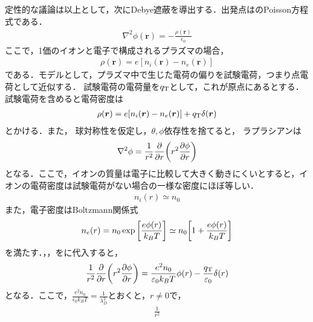 \documentclass{report}
\begin{document}
定性的な議論は以上として，次にDebye遮蔽を導出する．出発点はのPoisson方程式である．
\begin{align}
  \nabla^2 \phi(\bm{r}) = -\frac{\rho(\bm{r})}{\epsilon_0} \label{poisson-eq}
\end{align}
ここで，1価のイオンと電子で構成されるプラズマの場合，
\begin{align}
  \rho(\bm{r}) = e[n_i(\bm{r}) - n_e(\bm{r})]
\end{align}
である．モデルとして，プラズマ中で生じた電荷の偏りを試験電荷，つまり点電荷として近似する．
試験電荷の電荷量を$q_{\mathrm{T}}$として，これが原点にあるとする．
試験電荷を含めると電荷密度は
\begin{align}
  \rho(\bm{r}) = e[n_i(\bm{r}) - n_e(\bm{r})] + q_{\mathrm{T}}\delta(\bm{r}) \label{density-charge}
\end{align}
とかける．また，
球対称性を仮定し，$\theta,\phi$依存性を捨てると，
ラプラシアンは
\begin{align}
  \nabla^2\phi = \frac{1}{r^2} \frac{\partial}{\partial r} \qty(r^2 \frac{\partial \phi}{\partial r})
\end{align}
となる．ここで，イオンの質量は電子に比較して大きく動きにくいとすると，イオンの電荷密度は試験電荷がない場合の一様な密度にほぼ等しい．
\begin{align}
  n_i(r) \simeq n_0 \label{density-ion}
\end{align}
また，電子密度はBoltzmann関係式
\begin{align}
  n_e(r) = n_0\exp\qty[\frac{e\phi(r)}{k_B T}] \simeq n_0\qty[1 + \frac{e\phi(r)}{k_B T}] \label{density-e}
\end{align}
を満たす．，，をに代入すると，
\begin{align}
  \frac{1}{r^2}\frac{\partial}{\partial r}\qty(r^2\frac{\partial \phi}{\partial r}) = \frac{e^2 n_0}{\varepsilon_0 k_B T}\phi(r) - \frac{q_{\mathrm{T}}}{\varepsilon_0}\delta(r)
\end{align}
となる．ここで，$\frac{e^2 n_0}{\epsilon_0 k_B T} = \frac{1}{\lambda_D^2}$とおくと，$r\neq0$で，
\begin{align}
  \frac{1}{r^2}
\end{align}
\end{document}
